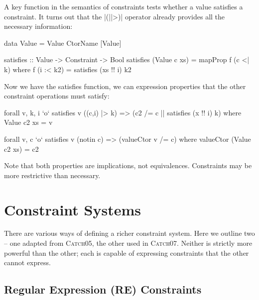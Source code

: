\documentclass[preprint]{sigplanconf}
\newcommand{\C}[1]{\textsf{#1}}
\newcommand{\catch}{\textsc{Catch}}
\begin{document}
A key function in the semantics of constraints tests whether a value satisfies a constraint. It turns out that the |(||>)| operator already provides all the necessary information:

\begin{code}
data Value = Value CtorName [Value]

satisfies :: Value -> Constraint -> Bool
satisfies (Value c xs) = mapProp f (c <| k)
    where f (i :< k2) = satisfies (xs !! i) k2
\end{code}

Now we have the \C{satisfies} function, we can expression properties that the other constraint operations must satisfy:

\begin{code}
forall v, k, i  `o` satisfies v ((c,i) |> k)
                => (c2 /= c || satisfies (x !! i) k)
    where Value c2 xs = v

forall v, c `o` satisfies v (notin c) => (valueCtor v /= c)
    where valueCtor (Value c2 xs) = c2
\end{code}

Note that both properties are implications, not equivalences. Constraints may be more restrictive than necessary.

\section{Constraint Systems}
\label{sec:constraint}

There are various ways of defining a richer constraint system. Here we outline two -- one adapted from \catch05, the other used in \catch07. Neither is strictly more powerful than the other; each is capable of expressing constraints that the other cannot express.

\subsection{Regular Expression (RE) Constraints}
\label{sec:regexp}
\end{document}
